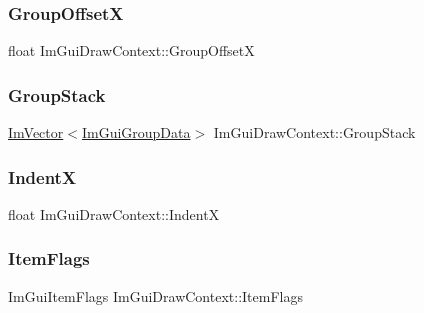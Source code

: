\subsubsection{\texorpdfstring{Group\+OffsetX}{GroupOffsetX}}
{\footnotesize\ttfamily float Im\+Gui\+Draw\+Context\+::\+Group\+OffsetX}

\hypertarget{struct_im_gui_draw_context_aa775f16a46bdfe8e131e25cab733afe0}{}\label{struct_im_gui_draw_context_aa775f16a46bdfe8e131e25cab733afe0} 
\subsubsection{\texorpdfstring{Group\+Stack}{GroupStack}}
{\footnotesize\ttfamily \hyperlink{class_im_vector}{Im\+Vector}$<$\hyperlink{struct_im_gui_group_data}{Im\+Gui\+Group\+Data}$>$ Im\+Gui\+Draw\+Context\+::\+Group\+Stack}

\hypertarget{struct_im_gui_draw_context_a3697085dca9164ca840d1fb1d52c8a66}{}\label{struct_im_gui_draw_context_a3697085dca9164ca840d1fb1d52c8a66} 
\subsubsection{\texorpdfstring{IndentX}{IndentX}}
{\footnotesize\ttfamily float Im\+Gui\+Draw\+Context\+::\+IndentX}

\hypertarget{struct_im_gui_draw_context_a8581650b6011e19f09b12b8bc50a51f5}{}\label{struct_im_gui_draw_context_a8581650b6011e19f09b12b8bc50a51f5} 
\subsubsection{\texorpdfstring{Item\+Flags}{ItemFlags}}
{\footnotesize\ttfamily Im\+Gui\+Item\+Flags Im\+Gui\+Draw\+Context\+::\+Item\+Flags}

\hypertarget{struct_im_gui_draw_context_a895d75185a81dc21bb6153090ab5b018}{}\label{struct_im_gui_draw_context_a895d75185a81dc21bb6153090ab5b018} 
